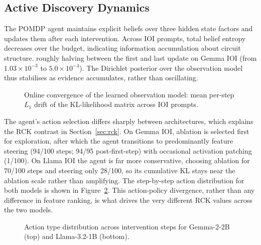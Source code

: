 \subsection{Active Discovery Dynamics}
\label{sec:dynamics}

The POMDP agent maintains explicit beliefs over three hidden state
factors and updates them after each intervention.  Across IOI prompts,
total belief entropy decreases over the budget, indicating information
accumulation about circuit structure.   roughly halving
between the first and last update on Gemma IOI (from $1.03\times10^{-3}$
to $5.0\times10^{-4}$).  The Dirichlet posterior over the observation
model thus stabilises as evidence accumulates, rather than oscillating.

\begin{figure}[H]
\centering

\caption{Online convergence of the learned observation model: mean
per-step $L_1$ drift of the KL-likelihood matrix across IOI prompts.}
\label{fig:aconv}
\end{figure}

The agent's action selection differs sharply between architectures,
which explains the RCK contrast in Section~\ref{sec:rck}.  On Gemma
IOI, ablation is selected first for exploration, after which the agent
transitions to predominantly feature steering (94/100 steps; 94/95
post-first-step) with occasional activation patching (1/100).  On
Llama IOI the agent is far more conservative, choosing ablation for
70/100 steps and steering only 28/100, so its cumulative KL stays
near the ablation scale rather than amplifying.  The step-by-step
action distribution for both models is shown in
Figure~\ref{fig:action_dist}.  This action-policy divergence, rather
than any difference in feature ranking, is what drives the very
different RCK values across the two models.

\begin{figure}[H]
\centering

\caption{Action type distribution across intervention steps for Gemma-2-2B (top) and Llama-3.2-1B (bottom).}
\label{fig:action_dist}
\end{figure}

